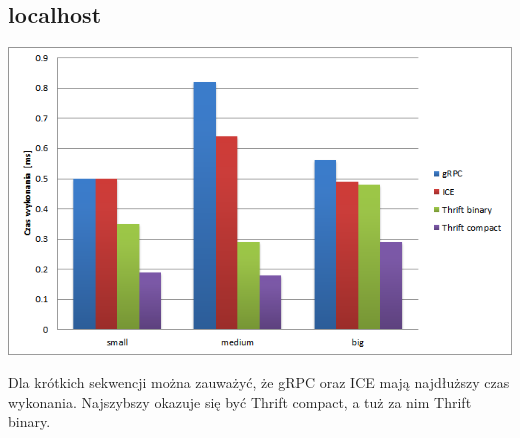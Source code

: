 \documentclass[12pt]{article}
\begin{document}
\subsection{localhost}
\begin{center}
\centering
    \includegraphics{localhost_seq5.png}
\end{center}

Dla krótkich sekwencji można zauważyć, że gRPC oraz ICE mają najdłuższy czas wykonania. Najszybszy okazuje się być Thrift compact, a tuż za nim Thrift binary.
\vspace{\baselineskip}
\end{document}
